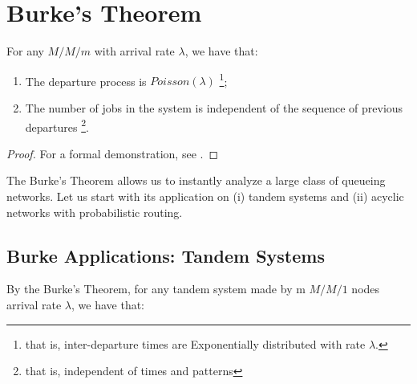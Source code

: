 \section{Burke's Theorem}
\label{sec:Burke-Theorem}

\begin{theorem}[Burke]
\label{thm:Burke}
	For any $M/M/m$ with arrival rate $\lambda$, we have that:
	
	\begin{enumerate}
		\item The departure process is $Poisson(\lambda)$
		\footnote{that is, inter-departure times are Exponentially distributed with rate $\lambda$.};
		
		\item The number of jobs in the system is independent of the sequence of previous departures
		\footnote{that is, independent of times and patterns}.
	\end{enumerate}
	\begin{proof}
		For a formal demonstration, see \cite{harchol2013performance}.
	\end{proof}
\end{theorem}

The Burke's Theorem allows us to instantly analyze a large class of queueing networks.
Let us start with its application on (i) tandem systems and (ii) acyclic networks with probabilistic routing.




\subsection{Burke Applications: Tandem Systems}
\label{sec:Burke-Application-Tandem-Systems}

By the Burke's Theorem, for any tandem system made by m $M/M/1$ nodes arrival rate $\lambda$, we have that:

